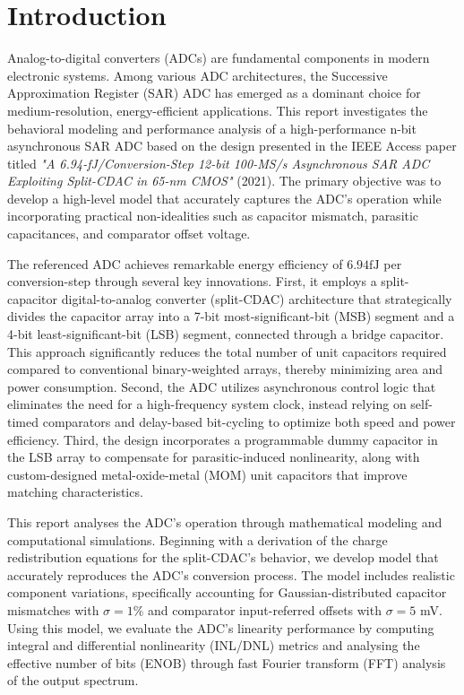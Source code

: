 \section{Introduction}

Analog-to-digital converters (ADCs) are fundamental components in modern electronic systems. Among various ADC architectures, the Successive Approximation Register (SAR) ADC has emerged as a dominant choice for medium-resolution, energy-efficient applications. This report investigates the behavioral modeling and performance analysis of a high-performance n-bit asynchronous SAR ADC based on the design presented in the IEEE Access paper titled \textit{"A 6.94-fJ/Conversion-Step 12-bit 100-MS/s Asynchronous SAR ADC Exploiting Split-CDAC in 65-nm CMOS"} (2021)\textsuperscript{\cite{article}}. The primary objective was to develop a high-level model that accurately captures the ADC's operation while incorporating practical non-idealities such as capacitor mismatch, parasitic capacitances, and comparator offset voltage.

The referenced ADC achieves remarkable energy efficiency of $6.94 \si{\femto \joule}$ per conversion-step through several key innovations. First, it employs a split-capacitor digital-to-analog converter (split-CDAC) architecture that strategically divides the capacitor array into a 7-bit most-significant-bit (MSB) segment and a 4-bit least-significant-bit (LSB) segment, connected through a bridge capacitor. This approach significantly reduces the total number of unit capacitors required compared to conventional binary-weighted arrays, thereby minimizing area and power consumption. Second, the ADC utilizes asynchronous control logic that eliminates the need for a high-frequency system clock, instead relying on self-timed comparators and delay-based bit-cycling to optimize both speed and power efficiency. Third, the design incorporates a programmable dummy capacitor in the LSB array to compensate for parasitic-induced nonlinearity, along with custom-designed metal-oxide-metal (MOM) unit capacitors that improve matching characteristics.

This report analyses the ADC's operation through mathematical modeling and computational simulations. Beginning with a derivation of the charge redistribution equations for the split-CDAC's behavior, we develop model that accurately reproduces the ADC's conversion process. The model includes realistic component variations, specifically accounting for Gaussian-distributed capacitor mismatches with $\sigma = 1\%$ and comparator input-referred offsets with $\sigma = 5$ mV. Using this model, we evaluate the ADC's linearity performance by computing integral and differential nonlinearity (INL/DNL) metrics and analysing the effective number of bits (ENOB) through fast Fourier transform (FFT) analysis of the output spectrum.

